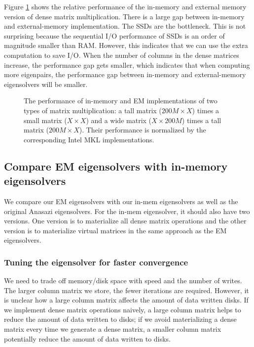 Figure \ref{perf:mat_mul} shows the relative performance of the in-memory
and external memory version of dense matrix multiplication.
There is a large gap between in-memory and external-memory implementation.
The SSDs are the bottleneck. This is not surprising because the sequential
I/O performance of SSDs is an order of magnitude smaller than RAM.
However, this indicates that we can use the extra computation to save I/O.
When the number of columns in the dense matrices increase, the performance
gap gets smaller, which indicates that when computing more eigenpairs,
the performance gap between in-memory and external-memory eigensolvers
will be smaller.



\begin{figure}
	\begin{center}
		\footnotesize
		\vspace{-15pt}
		
		\vspace{-15pt}
		\caption{The performance of in-memory and EM implementations of two types
			of matrix multiplication: a tall matrix ($200M \times X$) times
			a small matrix ($X \times X$) and a wide matrix ($X \times 200M$)
			times a tall matrix ($200M \times X$). Their performance is
		normalized by the corresponding Intel MKL implementations.}
		\label{perf:mat_mul}
	\end{center}
\end{figure}

\subsection{Compare EM eigensolvers with in-memory eigensolvers}
We compare our EM eigensolvers with our in-mem eigensolvers as well as the original
Anasazi eigensolvers. For the in-mem eigensolver, it should also have two versions.
One version is to materialize all dense matrix operations and the other version is
to materialize virtual matrices in the same approach as the EM eigensolvers.

\subsubsection{Tuning the eigensolver for faster convergence}
We need to trade off memory/disk space with speed and the number of writes.
The larger column matrix we store, the fewer iterations are required. However,
it is unclear how a large column matrix affects the amount of data written disks.
If we implement dense matrix operations naively, a large column matrix helps to
reduce the amount of data written to disks; if we avoid materializing a dense
matrix every time we generate a dense matrix, a smaller column matrix potentially
reduce the amount of data written to disks.

